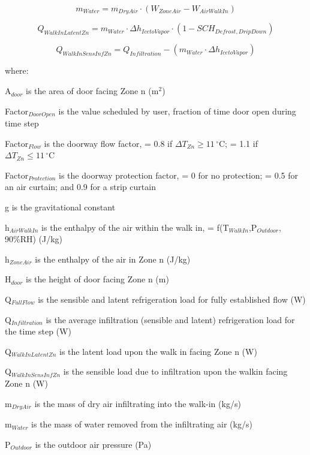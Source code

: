 \begin{equation}
m_{Water} = m_{DryAir} \cdot (W_{ZoneAir} - W_{AirWalkIn})
\end{equation}

\begin{equation}
Q_{WalkInLatentZn} = m_{Water} \cdot \Delta h_{IcetoVapor} \cdot (1 - SCH_{Defrost,DripDown})
\end{equation}

\begin{equation}
Q_{WalkInSensInfZn} = Q_{Infiltration} - (m_{Water} \cdot \Delta h_{IcetoVapor})
\end{equation}

where:

A\(_{door}\) is the area of door facing Zone n (m\(^{2}\))

Factor\(_{DoorOpen}\) is the value scheduled by user, fraction of time door open during time step

Factor\(_{Flow}\) is the doorway flow factor, = 0.8 if \(\Delta T_{Zn} \geq 11\,^{\circ}\mathrm{C}\); = 1.1 if \(\Delta T_{Zn} \leq 11\,^{\circ}\mathrm{C}\)

Factor\(_{Protection}\) is the doorway protection factor, = 0 for no protection; = 0.5 for an air curtain; and 0.9 for a strip curtain

g is the gravitational constant

h\(_{AirWalkIn}\) is the enthalpy of the air within the walk in, = f(T\(_{WalkIn}\),P\(_{Outdoor}\), 90\%RH) (J/kg)

h\(_{ZoneAir}\) is the enthalpy of the air in Zone n (J/kg)

H\(_{door}\) is the height of door facing Zone n (m)

Q\(_{FullFlow}\) is the sensible and latent refrigeration load for fully established flow (W)

Q\(_{Infiltration}\) is the average infiltration (sensible and latent) refrigeration load for the time step (W)

Q\(_{WalkInLatentZn}\) is the latent load upon the walk in facing Zone n (W)

Q\(_{WalkInSensInfZn}\) is the sensible load due to infiltration upon the walkin facing Zone n (W)

m\(_{DryAir}\) is the mass of dry air infiltrating into the walk-in (kg/s)

m\(_{Water}\) is the mass of water removed from the infiltrating air (kg/s)

P\(_{Outdoor}\) is the outdoor air pressure (Pa)

